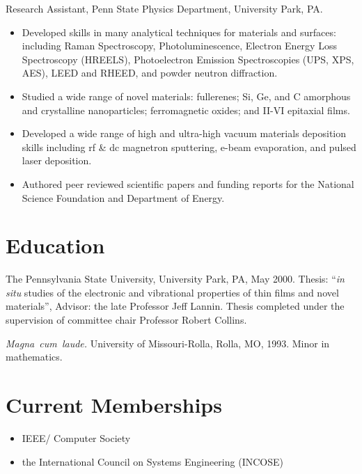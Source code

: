 \documentclass[american]{cv}
\begin{document}
\begin{topic}
\item [1993-2000]Research Assistant, Penn State Physics Department, University
Park, PA.
\begin{itemize}

\item Developed skills in many analytical techniques for materials and surfaces:
including Raman Spectroscopy, Photoluminescence, Electron Energy Loss
Spectroscopy (HREELS), Photoelectron Emission Spectroscopies (UPS,
XPS, AES), LEED and RHEED, and powder neutron diffraction.

\item Studied a wide range of novel materials: fullerenes; Si, Ge, and C
amorphous and crystalline nanoparticles; ferromagnetic oxides; and
II-VI epitaxial films.

\item Developed a wide range of high and ultra-high vacuum materials deposition
skills including rf \& dc magnetron sputtering, e-beam evaporation,
and pulsed laser deposition.

\item Authored peer reviewed scientific papers and funding reports for the
National Science Foundation and Department of Energy.

\end{itemize}
\end{topic}

\section{Education }

\begin{topic}
\item [Ph.~D.~Physics]The Pennsylvania State University, University Park,
PA, May 2000. Thesis: ``\emph{in situ} studies of the electronic and vibrational
properties of thin films and novel materials'', Advisor: the late Professor
Jeff Lannin. Thesis completed under the supervision of committee chair
Professor Robert Collins.
\item [B.S.~Physics]\emph{Magna~cum~laude.} University of Missouri-Rolla,
Rolla, MO, 1993. Minor in mathematics.
\end{topic}

\section{Current Memberships }

\begin{itemize}
\item IEEE/ Computer Society
\item the International Council on Systems Engineering (INCOSE) 
\end{itemize}
\end{document}
